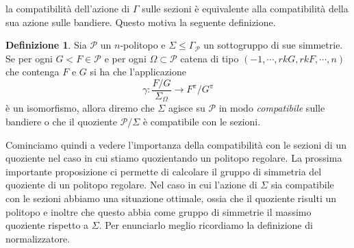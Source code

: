 \documentclass[a4paper,12pt]{report}
\newcommand{\p}{\mathcal{P}}
\theoremstyle{plain}
\theoremstyle{definition}
\newtheorem{defin}[teo]{Definizione}
\begin{document}
la compatibilit\`a dell'azione di $\Gamma$ sulle sezioni \`e equivalente alla compatibilit\`a della sua azione sulle bandiere. Questo motiva la seguente
definizione.
\begin{defin}
\label{def:SectionCompatible}
Sia $\p$ un $n$-politopo e $\Sigma\leq\Gamma_\p$ un sottogruppo di sue simmetrie. Se per ogni $G<F\in\p$ e per ogni $\Omega\subset\p$ catena di tipo
$(-1,\cdots,rkG,rkF,\cdots,n)$ che contenga $F$ e $G$ si ha che l'applicazione
\begin{equation}
\gamma:\frac{F/G}{\Sigma_\Omega}\longrightarrow F^\pi/G^\pi
\end{equation}
\`e un isomorfismo, allora diremo che $\Sigma$ agisce su $\p$ in modo \emph{compatibile} sulle bandiere o che il quoziente $\p/\Sigma$ \`e compatibile
con le sezioni.
\end{defin}
Cominciamo quindi a vedere l'importanza della compatibilit\`a con le sezioni di un quoziente nel caso in cui stiamo quozientando un politopo regolare.
La prossima importante proposizione ci permette di calcolare il gruppo di simmetria del quoziente di un politopo regolare. Nel caso in cui l'azione
di $\Sigma$ sia compatibile con le sezioni abbiamo una situazione ottimale, ossia che il quoziente risulti un politopo e inoltre che questo abbia
come gruppo di simmetrie il massimo quoziente rispetto a $\Sigma$. Per enunciarlo meglio ricordiamo la definizione di normalizzatore.
\end{document}
